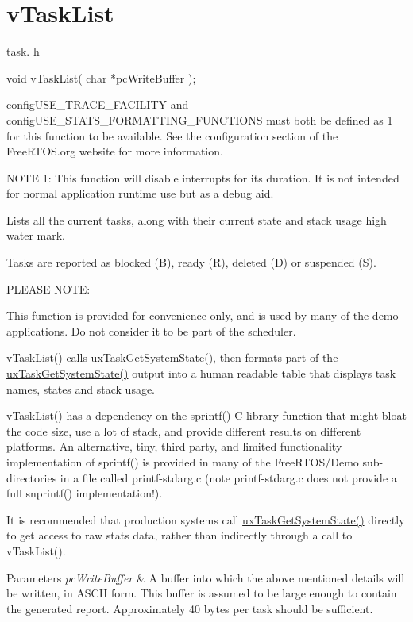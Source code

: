 \hypertarget{group__v_task_list}{}\section{v\+Task\+List}
\label{group__v_task_list}
task. h 
\begin{DoxyPre}void vTaskList( char *pcWriteBuffer );\end{DoxyPre}


config\+U\+S\+E\+\_\+\+T\+R\+A\+C\+E\+\_\+\+F\+A\+C\+I\+L\+I\+TY and config\+U\+S\+E\+\_\+\+S\+T\+A\+T\+S\+\_\+\+F\+O\+R\+M\+A\+T\+T\+I\+N\+G\+\_\+\+F\+U\+N\+C\+T\+I\+O\+NS must both be defined as 1 for this function to be available. See the configuration section of the Free\+R\+T\+O\+S.\+org website for more information.

N\+O\+TE 1\+: This function will disable interrupts for its duration. It is not intended for normal application runtime use but as a debug aid.

Lists all the current tasks, along with their current state and stack usage high water mark.

Tasks are reported as blocked (\textquotesingle{}B\textquotesingle{}), ready (\textquotesingle{}R\textquotesingle{}), deleted (\textquotesingle{}D\textquotesingle{}) or suspended (\textquotesingle{}S\textquotesingle{}).

P\+L\+E\+A\+SE N\+O\+TE\+:

This function is provided for convenience only, and is used by many of the demo applications. Do not consider it to be part of the scheduler.

v\+Task\+List() calls \hyperlink{group___tasks_gaa4603f3de3d809e9beb18d10fbac005d}{ux\+Task\+Get\+System\+State()}, then formats part of the \hyperlink{group___tasks_gaa4603f3de3d809e9beb18d10fbac005d}{ux\+Task\+Get\+System\+State()} output into a human readable table that displays task names, states and stack usage.

v\+Task\+List() has a dependency on the sprintf() C library function that might bloat the code size, use a lot of stack, and provide different results on different platforms. An alternative, tiny, third party, and limited functionality implementation of sprintf() is provided in many of the Free\+R\+T\+O\+S/\+Demo sub-\/directories in a file called printf-\/stdarg.\+c (note printf-\/stdarg.\+c does not provide a full snprintf() implementation!).

It is recommended that production systems call \hyperlink{group___tasks_gaa4603f3de3d809e9beb18d10fbac005d}{ux\+Task\+Get\+System\+State()} directly to get access to raw stats data, rather than indirectly through a call to v\+Task\+List().


\begin{DoxyParams}{Parameters}
{\em pc\+Write\+Buffer} & A buffer into which the above mentioned details will be written, in A\+S\+C\+II form. This buffer is assumed to be large enough to contain the generated report. Approximately 40 bytes per task should be sufficient. \\
\hline
\end{DoxyParams}
